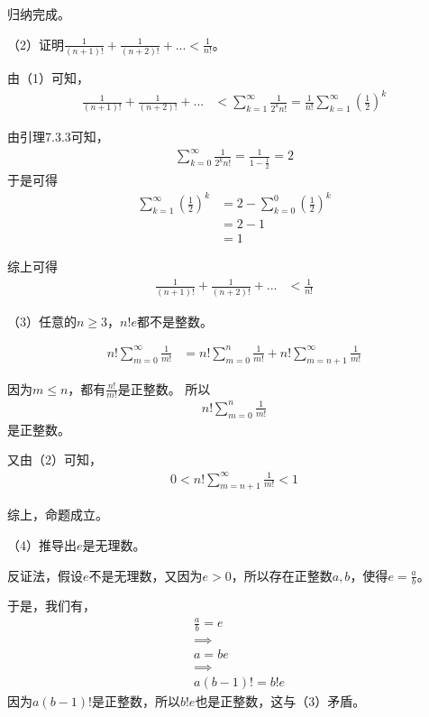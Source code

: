 \documentclass{article}
\begin{document}
归纳完成。

（2）证明$\frac{1}{(n + 1)!} + \frac{1}{(n + 2)!} + ... < \frac{1}{n!}$。

由（1）可知，
\begin{align*}
  \frac{1}{(n + 1)!} + \frac{1}{(n + 2)!} + ...
   & < \sum\limits_{k = 1}^\infty \frac{1}{2^kn!} = \frac{1}{n!}\sum\limits_{k = 1}^\infty (\frac{1}{2})^k
\end{align*}

由引理7.3.3可知，
\begin{align*}
  \sum\limits_{k = 0}^\infty \frac{1}{2^kn!} = \frac{1}{1-\frac{1}{2}} = 2
\end{align*}
于是可得
\begin{align*}
  \sum\limits_{k = 1}^\infty (\frac{1}{2})^k
   & = 2 - \sum\limits_{k = 0}^0 (\frac{1}{2})^k \\
   & = 2 - 1                                     \\
   & = 1
\end{align*}

综上可得
\begin{align*}
  \frac{1}{(n + 1)!} + \frac{1}{(n + 2)!} + ...
   & < \frac{1}{n!}
\end{align*}

（3）任意的$n \geq 3$，$n!e$都不是整数。

\begin{align*}
  n!\sum\limits_{m = 0}^\infty \frac{1}{m!}
   & = n!\sum\limits_{m = 0}^n \frac{1}{m!} + n!\sum\limits_{m = n + 1}^\infty \frac{1}{m!}
\end{align*}

因为$m \leq n$，都有$\frac{n!}{m!}$是正整数。
所以
\begin{align*}
  n!\sum\limits_{m = 0}^n \frac{1}{m!}
\end{align*}
是正整数。

又由（2）可知，
\begin{align*}
  0 < n!\sum\limits_{m = n + 1}^\infty \frac{1}{m!} < 1
\end{align*}

综上，命题成立。

（4）推导出$e$是无理数。

反证法，假设$e$不是无理数，又因为$e > 0$，所以存在正整数$a, b$，使得$e = \frac{a}{b}$。

于是，我们有，
\begin{align*}
   & \frac{a}{b} = e  \\
   & \implies         \\
   & a = b e          \\
   & \implies         \\
   & a(b - 1)! = b! e
\end{align*}
因为$a(b - 1)!$是正整数，所以$b! e$也是正整数，这与（3）矛盾。
\end{document}
